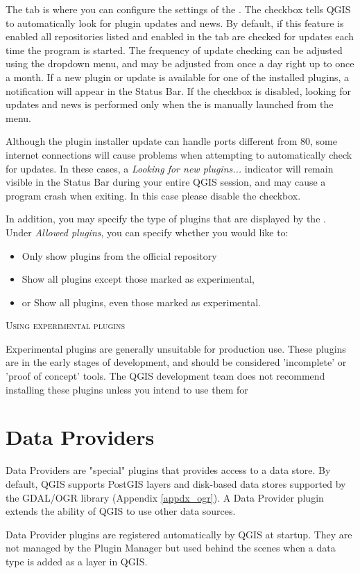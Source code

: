 
The  tab is where you can configure the settings of the . The  checkbox tells QGIS to automatically look for plugin updates and news. By default, if this feature is enabled all repositories listed and enabled in the  tab are checked for updates each time the program is started. The frequency of update checking can be adjusted using the dropdown menu, and may be adjusted from once a day right up to once a month. If a new plugin or update is available for one of the installed plugins, a notification will appear in the Status Bar. If the checkbox is disabled, looking for updates and news is performed only when the  is manually launched from the menu.

Although the plugin installer update can handle ports different from 80, some internet 
connections will cause problems when attempting to automatically check for updates. 
In these cases, a \textit{Looking for new plugins...} indicator will 
remain visible in the Status Bar during your entire QGIS session, and may cause a 
program crash when exiting. In this case please disable the checkbox.

In addition, you may specify the type of plugins that are displayed by the . Under \textit{Allowed plugins}, you can specify whether you would like to:

\begin{itemize}[label=--]
\item Only show plugins from the official repository
\item Show all plugins except those marked as experimental,
\item or Show all plugins, even those marked as experimental.
\end{itemize}

\begin{Tip}
 \caption{\textsc{Using experimental plugins}}
Experimental plugins are generally unsuitable for production use. These plugins are in the early stages of development, and should be considered 'incomplete' or 'proof of concept' tools. The QGIS development team does not recommend installing these plugins unless you intend to use them for 
\end{Tip}

\section{Data Providers}

Data Providers are "special" plugins that provides access to a data store.
By default, QGIS supports PostGIS layers and disk-based data stores supported by the GDAL/OGR library (Appendix \ref{appdx_ogr}).
A Data Provider plugin extends the ability of QGIS to use other data sources.

Data Provider plugins are registered automatically by QGIS at startup.
They are not managed by the Plugin Manager but used behind the scenes when a data type is added as a layer in QGIS.
